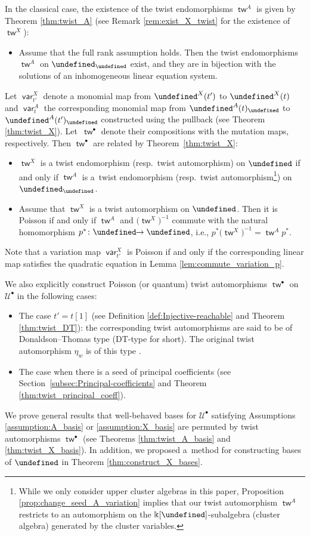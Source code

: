 \documentclass[10pt,a4paper]{amsart}
\newcommand{\kk}{\Bbbk}
\newcommand{\Q}{\mathbb{Q}}
\renewcommand{\tilde}[1]{\widetilde{#1}}
\newcommand{\opname}[1]{\operatorname{\mathsf{#1}}}
\newcommand{\cU}{{\mathcal U}}
\newcommand{\tw}{{\tilde{w}}}
\newcommand{\var}{\opname{var}}
\let\upClAlg\undefined
\let\XClAlg\undefined
\let\LP\undefined
\let\fFac\undefined
\let\fFacRoot\undefined
\renewcommand{\tw}{\opname{tw}}
\newcommand{\upClAlg}{\mathcal{U}^A}
\newcommand{\XClAlg}{\mathcal{U}^X}
\newcommand{\LP}{{\mathcal{LP}}}
\newcommand{\fFac}{\mathcal{Z}}
\newcommand{\fFacRoot}{\fFac^{\Q}}
\renewcommand{\tw}{\opname{tw}}
\numberwithin{equation}{section}
\begin{document}
In the classical case, the existence of the twist endomorphisms $\tw^{A}$ is given by Theorem
\ref{thm:twist_A} \big(see Remark \ref{rem:exist_X_twist} for the existence
of $\tw^{X}$\big):
\begin{itemize}\itemsep=0pt
\item Assume that the full rank assumption holds. Then the twist endomorphisms
$\tw^{A}$ on $\upClAlg_{\fFacRoot}$ exist, and they are in bijection
with the solutions of an inhomogeneous linear equation system.
\end{itemize}
Let $\var_{t'}^{X}$ denote a monomial map from $\LP^{X}(t')$ to
$\LP^{X}(t)$ and $\var_{t}^{A}$ the corresponding monomial map from
$\LP^{A}(t)_{\fFacRoot}$ to $\LP^{A}(t')_{\fFacRoot}$ constructed
using the pullback (see Theorem \ref{thm:twist_X}). Let~$\tw^{\bullet}$
denote their compositions with the mutation maps, respectively. Then
$\tw^{\bullet}$ are related by Theorem~\ref{thm:twist_X}:
\begin{itemize}\itemsep=0pt
\item $\tw^{X}$ is a twist endomorphism (resp.\ twist automorphism) on $\XClAlg$
if and only if $\tw^{A}$ is a~twist endomorphism (resp.\ twist automorphism\footnote{While we only consider upper cluster algebras in this paper, Proposition \ref{prop:change_seed_A_variation} implies that our twist automorphism $\tw^{A}$ restricts to an automorphism on the $\kk[\fFacRoot]$-subalgebra (cluster algebra) generated by the cluster variables.})
on $\upClAlg_{\fFacRoot}$.
\item Assume that $\tw^{X}$ is a twist automorphism on $\XClAlg$.
Then it is Poisson if and only if $\tw^{A}$ and $\bigl(\tw^{X}\bigr)^{-1}$
commute with the natural homomorphism $p^{*}\colon\XClAlg\!\!\rightarrow\upClAlg$,
i.e., ${p^{*}\bigl(\tw^{X}\bigr)^{-1}\!=\!\tw^{A}p^{*}}$.
\end{itemize}
Note that a variation map $\var_{t'}^{X}$ is Poisson if and only if the corresponding linear map satisfies the quadratic equation in Lemma \ref{lem:commute_variation_p}.

We also explicitly construct Poisson (or quantum) twist automorphisms $\tw^{\bullet}$
on $\cU^{\bullet}$ in the following cases:
\begin{itemize}\itemsep=0pt
\item The case $t'=t[1]$ (see Definition \ref{def:Injective-reachable} and Theorem
\ref{thm:twist_DT}): the corresponding twist automorphisms are said
to be of Donaldson--Thomas type (DT-type for short). The original twist
automorphism $\eta_{w}$ is of this type \cite{qin2020dual}.
\item The case when there is a seed of principal coefficients (see Section~\ref{subsec:Principal-coefficients} and
Theorem \ref{thm:twist_principal_coeff}).
\end{itemize}
We prove general results that well-behaved bases for $\cU^{\bullet}$ satisfying Assumptions \ref{assumption:A_basis} or \ref{assumption:X_basis}
are permuted by twist automorphisms $\tw^{\bullet}$ (see Theorems \ref{thm:twist_A_basis}
and \ref{thm:twist_X_basis}). In addition, we proposed a~method for constructing bases of $\XClAlg$ in Theorem \ref{thm:construct_X_bases}.
\end{document}
